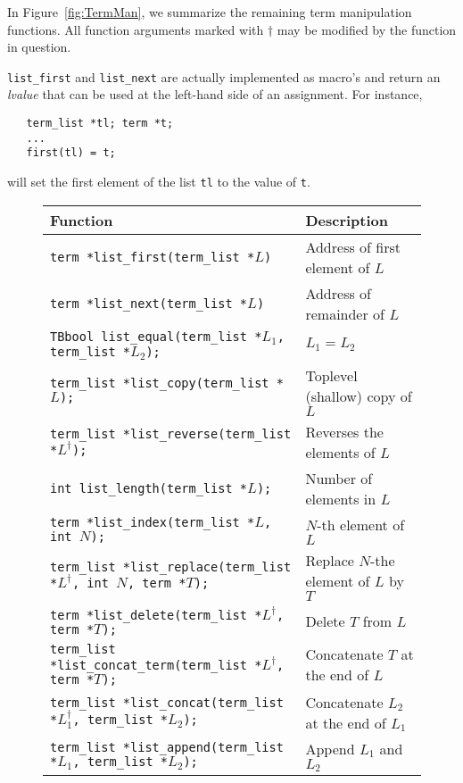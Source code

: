 \documentclass[a4,twoside,noweb]{article} %
\begin{document}
In Figure~\ref{fig:TermMan}, we summarize the remaining term manipulation functions.
All function arguments marked with $\dag$ may be modified by the function in question.

{\tt list\_first} and {\tt list\_next} are actually implemented as macro's and 
return an {\em lvalue} that can be used
at the left-hand side of an assignment.
For instance,
\begin{verbatim}
   term_list *tl; term *t;
   ...
   first(tl) = t;
\end{verbatim}
will set the first element of the list {\tt tl} to the value of {\tt t}.

\begin{figure}[tb]
\begin{center}
\begin{tabular}{|l|p{5cm}|}
\hline Function		& Description				\\ \hline \hline
{\tt term *list\_first(term\_list *$L$)}					& Address of first element of $L$\\
{\tt term *list\_next(term\_list *$L$)}					& Address of remainder of $L$\\ \hline
{\tt TBbool     list\_equal(term\_list *$L_1$, term\_list *$L_2$);}	& $L_1 = L_2$\\
{\tt term\_list *list\_copy(term\_list *$L$);}					& Toplevel (shallow) copy of $L$\\
{\tt term\_list *list\_reverse(term\_list *$L^{\dag}$);}			& Reverses the elements of $L$\\
{\tt int        list\_length(term\_list *$L$);}					& Number of elements in $L$\\ \hline
{\tt term      *list\_index(term\_list *$L$, int $N$);}				& $N$-th element of $L$\\
{\tt term\_list *list\_replace(term\_list *$L^{\dag}$, int $N$, term *$T$);}	&  Replace $N$-the element of $L$ by $T$\\
{\tt term      *list\_delete(term\_list *$L^{\dag}$, term *$T$);}		& Delete $T$ from $L$\\ \hline

{\tt term\_list *list\_concat\_term(term\_list *$L^{\dag}$, term *$T$);}	& Concatenate $T$ at the end of $L$ \\
{\tt term\_list *list\_concat(term\_list *$L_1^{\dag}$, term\_list *$L_2$);}	& Concatenate $L_2$ at the end of $L_1$\\
{\tt term\_list *list\_append(term\_list *$L_1$, term\_list *$L_2$);}		& Append $L_1$ and $L_2$\\


\end{tabular}
\end{center}
\end{figure}
\end{document}
